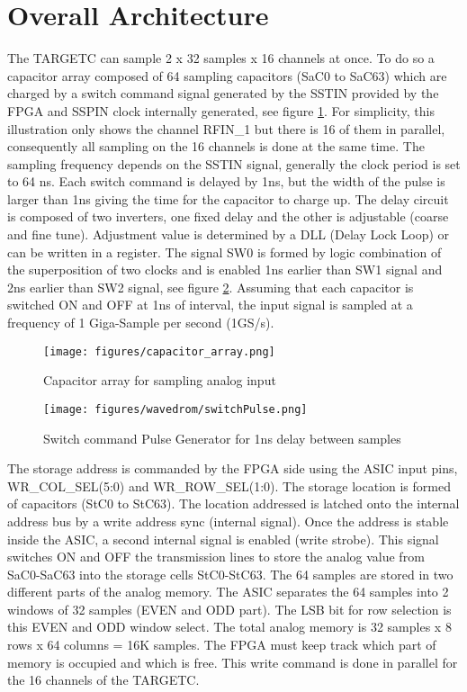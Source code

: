 \section{Overall Architecture}
The TARGETC can sample 2 x 32 samples x 16 channels at once. To do so a capacitor array composed of 64 sampling capacitors (SaC0 to SaC63) which are charged by a switch command signal generated by the SSTIN provided by the FPGA and SSPIN clock internally generated,  see figure \ref{fig:capacitorarray2}. For simplicity, this illustration only shows the channel RFIN\_1 but there is 16 of them in parallel, consequently all sampling on the 16 channels is done at the same time. The sampling frequency depends on the SSTIN signal, generally the clock period is set to 64 ns. Each switch command is delayed by 1ns, but the width of the pulse is larger than 1ns giving the time for the capacitor to charge up. The delay circuit is composed of two inverters, one fixed delay and the other is adjustable (coarse and fine tune). Adjustment value is determined by a DLL (Delay Lock Loop) or can be written in a register. The signal SW0 is formed by logic combination of the superposition of two clocks and is enabled 1ns earlier than SW1 signal and 2ns earlier than SW2  signal, see figure \ref{fig:pulse1ns}. Assuming that each capacitor is switched ON and OFF at 1ns of interval, the input signal is sampled at a frequency of 1 Giga-Sample per second (1GS/s).

\begin{figure}[H]
\centering
\texttt{[image: figures/capacitor\_array.png]}\\
\caption{\label{fig:capacitorarray2} Capacitor array for sampling analog input}
\end{figure}

\begin{figure}[H]
\centering
\texttt{[image: figures/wavedrom/switchPulse.png]}\\
\caption{\label{fig:pulse1ns} Switch command Pulse Generator for 1ns delay between samples}
\end{figure}

\noindent
The storage address is commanded by the FPGA side using the ASIC input pins, WR\_COL\_SEL(5:0) and WR\_ROW\_SEL(1:0). The storage location is formed of capacitors (StC0 to StC63). The location addressed is latched onto the internal address bus by a write address sync (internal signal). Once the address is stable inside the ASIC, a second internal signal is enabled (write strobe). This signal switches ON and OFF the transmission lines to store the analog value from SaC0-SaC63 into the storage cells StC0-StC63. The 64 samples are stored in two different parts of the analog memory. The ASIC separates the 64 samples into 2 windows of 32 samples (EVEN and ODD part). The LSB bit for row selection is this EVEN and ODD window select. The total analog memory is 32 samples x 8 rows x 64 columns = 16K samples. The FPGA must keep track which part of memory is occupied and which is free. This write command is done in parallel for the 16 channels of the TARGETC.


